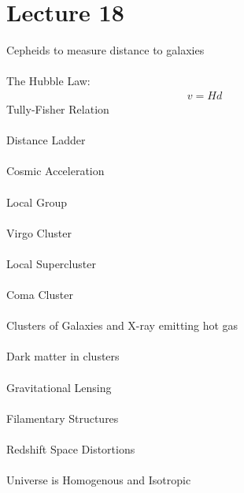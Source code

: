 \documentclass[11pt,reqno]{article}
\theoremstyle{definition}
\begin{document}
\section*{Lecture 18}
Cepheids to measure distance to galaxies\\\\
The Hubble Law:
\begin{align*}
    v = Hd
\end{align*}
Tully-Fisher Relation\\\\
Distance Ladder\\\\
Cosmic Acceleration\\\\
Local Group\\\\
Virgo Cluster\\\\
Local Supercluster\\\\
Coma Cluster\\\\
Clusters of Galaxies and X-ray emitting hot gas\\\\
Dark matter in clusters\\\\
Gravitational Lensing\\\\
Filamentary Structures\\\\
Redshift Space Distortions\\\\
Universe is Homogenous and Isotropic\\\\
\end{document}
